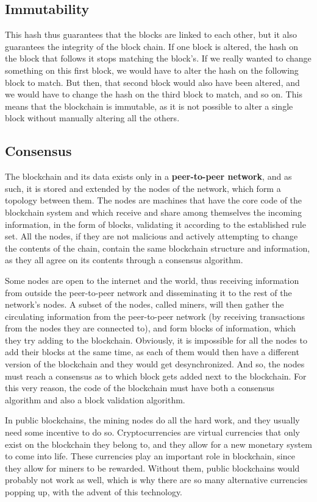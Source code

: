 \subsection{Immutability}
    This hash thus guarantees that the blocks are linked to each other, but it also guarantees the integrity of the block chain. If one block is altered, the hash on the block that follows it stops matching the block's. If we really wanted to change something on this  first block, we would have to alter the hash on the following block to match. But then, that second block would also have been altered, and we would have to change the hash on the third block to match, and so on. This means that the blockchain is immutable, as it is not possible to alter a single block without manually altering all the others. 
    
\subsection{Consensus}
    The blockchain and its data exists only in a \textbf{peer-to-peer network}, and as such, it is stored and extended by the nodes of the network, which form a topology between them. The nodes are machines that have the core code of the blockchain system and which receive and share among themselves the incoming information, in the form of blocks, validating it according to the established rule set. All the nodes, if they are not malicious and actively attempting to change the contents of the chain, contain the same blockchain structure and information, as they all agree on its contents through a consensus algorithm. 
    
     Some nodes are open to the internet and the world, thus receiving information from outside the peer-to-peer network and disseminating it to the rest of the network's nodes. A subset of the nodes, called miners, will then gather the circulating information from the peer-to-peer network (by receiving transactions from the nodes they are connected to), and form blocks of information, which they try adding to the blockchain. Obviously, it is impossible for all the nodes to add their blocks at the same time, as each of them would then have a different version of the blockchain and they would get desynchronized. And so, the nodes must reach a consensus as to which block gets added next to the blockchain. For this very reason, the code of the blockchain must have both a consensus algorithm and also a block validation algorithm.
     
     In public blockchains, the mining nodes do all the hard work, and they usually need some incentive to do so. Cryptocurrencies are virtual currencies that only exist on the blockchain they belong to, and they allow for a new monetary system to come into life. These currencies play an important role in blockchain, since they allow for miners to be rewarded. Without them, public blockchains would probably not work as well, which is why there are so many alternative currencies popping up, with the advent of this technology. 
     
